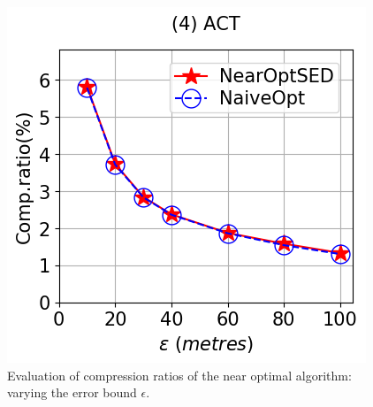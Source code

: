 \begin{figure}[h]
	\includegraphics[scale=0.2]{Figures/Exp-Append-NearOpt-CR-epsilon-zh.png}		\hspace{-2ex}
	\vspace{-2.5ex}
	\caption{\small Evaluation of compression ratios of the near optimal algorithm: varying the error bound $\epsilon$.}
	\label{fig:cr-nopts}
	\vspace{-4ex}
\end{figure}



